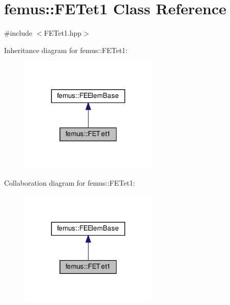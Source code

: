 \hypertarget{classfemus_1_1_f_e_tet1}{}\section{femus\+:\+:F\+E\+Tet1 Class Reference}
\label{classfemus_1_1_f_e_tet1}


{\ttfamily \#include $<$F\+E\+Tet1.\+hpp$>$}



Inheritance diagram for femus\+:\+:F\+E\+Tet1\+:
\nopagebreak
\begin{figure}[H]
\begin{center}
\leavevmode
\includegraphics[width=188pt]{classfemus_1_1_f_e_tet1__inherit__graph}
\end{center}
\end{figure}


Collaboration diagram for femus\+:\+:F\+E\+Tet1\+:
\nopagebreak
\begin{figure}[H]
\begin{center}
\leavevmode
\includegraphics[width=188pt]{classfemus_1_1_f_e_tet1__coll__graph}
\end{center}
\end{figure}
